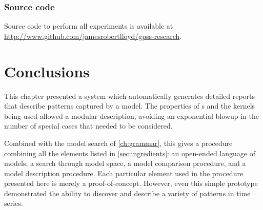 \subsubsection{Source code}
Source code to perform all experiments is available at \\\url{http://www.github.com/jamesrobertlloyd/gpss-research}. 




\section{Conclusions}
This chapter presented a system which automatically generates detailed reports that describe patterns captured by a \gp{} model.
The properties of \gp{}s and the kernels being used allowed a modular description, avoiding an exponential blowup in the number of special cases that needed to be considered.

Combined with the model search of \cref{ch:grammar}, this gives a procedure combining all the elements listed in \cref{sec:ingredients}:
an open-ended language of models, a search through model space, a model comparison procedure, and a model description procedure.
Each particular element used in the procedure presented here is merely a proof-of-concept.
However, even this simple prototype demonstrated the ability to discover and describe a variety of patterns in time series.









\outbpdocument{


}


